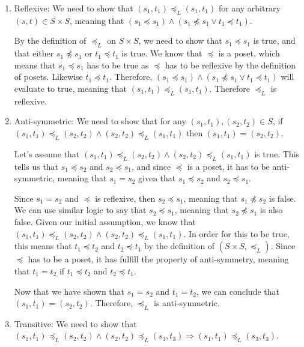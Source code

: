 \documentclass{article}
\begin{document}
\begin{enumerate}

\item Reflexive: We need to show that $(s_1, t_1) \preceq_{L} (s_1, t_1)$ for any arbitrary $(s, t) \in S \times S$, meaning that $(s_1\preceq s_1) \land (s_1 \npreceq s_1 \lor t_1 \preceq t_1)$.

By the definition of $\preceq_{L}$ on $S \times S$, we need to show that $s_1 \preceq s_1$ is true, and that either $s_1 \npreceq s_1$ or $t_1 \preceq t_1$ is true. We know that $\preceq$ is a poset, which means that $s_1 \preceq s_1$ has to be true as $\preceq$ has to be reflexive by the definition of posets. Likewise $t_1 \preceq t_1$. Therefore, $(s_1\preceq s_1) \land (s_1 \npreceq s_1 \lor t_1 \preceq t_1)$ will evaluate to true, meaning that $(s_1, t_1) \preceq_{L} (s_1, t_1)$. Therefore $\preceq_{L}$ is reflexive.

\item Anti-symmetric: We need to show that for any $(s_1, t_1), (s_2, t_2) \in S$, if $(s_1, t_1) \preceq_{L} (s_2, t_2) \land (s_2, t_2) \preceq_{L} (s_1, t_1)$ then $(s_1, t_1) = (s_2, t_2)$.

Let's assume that $(s_1, t_1) \preceq_{L} (s_2, t_2) \land (s_2, t_2) \preceq_{L} (s_1, t_1)$ is true. This tells us that $s_1 \preceq s_2$ and $s_2 \preceq s_1$, and since $\preceq$ is a poset, it has to be anti-symmetric, meaning that $s_1 = s_2$ given that $s_1 \preceq s_2$ and $s_2 \preceq s_1$.

Since $s_1 = s_2$ and $\preceq$ is reflexive, then $s_2 \preceq s_1$, meaning that $s_1 \npreceq s_2$ is false. We can use similar logic to say that $s_2 \preceq s_1$, meaning that $s_2 \npreceq s_1$ is also false. Given our initial assumption, we know that $(s_1, t_1) \preceq_{L} (s_2, t_2) \land (s_2, t_2) \preceq_{L} (s_1, t_1)$. In order for this to be true, this means that $t_1 \preceq t_2$ and $t_2 \preceq t_1$ by the definition of $(S \times S, \preceq_{L})$. Since $\preceq$ has to be a poset, it has fulfill the property of anti-symmetry, meaning that $t_1 = t_2$ if $t_1 \preceq t_2$ and $t_2 \preceq t_1$.

Now that we have shown that $s_1 = s_2$ and $t_1 = t_2$, we can conclude that $(s_1, t_1) = (s_2, t_2)$. Therefore, $\preceq_{L}$ is anti-symmetric.

\item Transitive: We need to show that $(s_1, t_1) \preceq_{L} (s_2, t_2) \land (s_2, t_2) \preceq_{L} (s_3, t_3) \Rightarrow (s_1, t_1) \preceq_{L} (s_3, t_3)$.


\end{enumerate}
\end{document}
